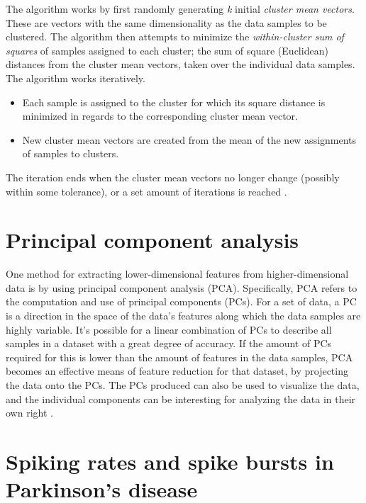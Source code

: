 \documentclass{kththesis}
\begin{document}
The algorithm works by first randomly generating \textit{k} initial \textit{cluster mean vectors}. 
These are vectors with the same dimensionality as the data samples to be clustered. 
The algorithm then attempts to minimize the \textit{within-cluster sum of squares} of samples assigned to each cluster; the sum of square (Euclidean) distances from the cluster mean vectors, taken over the individual data samples.
The algorithm works iteratively. 
\begin{itemize}
    \item Each sample is assigned to the cluster for which its square distance is minimized in regards to the corresponding cluster mean vector.
    \item New cluster mean vectors are created from the mean of the new assignments of samples to clusters.
\end{itemize}
The iteration ends when the cluster mean vectors no longer change (possibly within some tolerance), or a set amount of iterations is reached \parencite[p258-260]{PractStats}.

\section{Principal component analysis}\label{PCA BG}

One method for extracting lower-dimensional features from higher-dimensional data is by using principal component analysis (PCA).
Specifically, PCA refers to the computation and use of principal components (PCs).
For a set of data, a PC is a direction in the space of the data's features along which the data samples are highly variable.
It's possible for a linear combination of PCs to describe all samples in a dataset with a great degree of accuracy.
If the amount of PCs required for this is lower than the amount of features in the data samples, PCA becomes an effective means of feature reduction for that dataset, by projecting the data onto the PCs.
The PCs produced can also be used to visualize the data, and the individual components can be interesting for analyzing the data in their own right \parencite[p374-380]{ISLR}.

\section{Spiking rates and spike bursts in Parkinson's disease}\label{BG SpikeRates}
\end{document}
